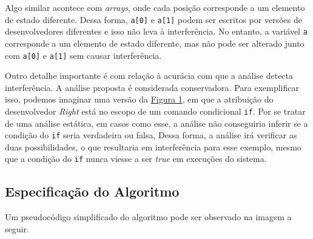 Algo similar acontece com \emph{arrays}, onde cada posição corresponde a um elemento de estado diferente. Dessa forma, \texttt{a[0]} e \texttt{a[1]} podem ser escritos por versões de desenvolvedores diferentes e isso não leva à interferência. No entanto, a variável \texttt{a} corresponde a um elemento de estado diferente, mas não pode ser alterado junto com \texttt{a[0]} e \texttt{a[1]} sem causar interferência.

Outro detalhe importante é com relação à acurácia com que a análise detecta interferência. A análise proposta é considerada conservadora. Para exemplificar isso, podemos imaginar uma versão da \hyperref[fig:codigo-motivador]{Figura 1}, em que a atribuição do desenvolvedor \emph{Right} está no escopo de um comando condicional \texttt{if}. Por se tratar de uma análise estática, em casos como esse, a análise não conseguiria inferir se a condição do \texttt{if} seria verdadeira ou falsa, Dessa forma, a análise irá verificar as duas possibilidades, o que resultaria em interferência para esse exemplo, mesmo que a condição do \texttt{if} nunca viesse a ser \emph{true} em execuções do sistema.

\subsection{Especificação do Algoritmo}

Um pseudocódigo simplificado do algoritmo pode ser observado na imagem a seguir.


